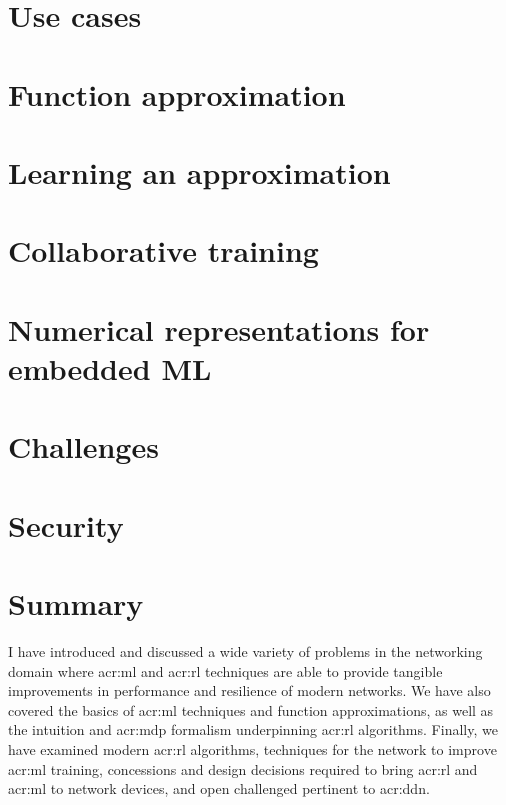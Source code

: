 \section{Use cases}\label{sec:use-cases}%


\section{Function approximation}\label{sec:function-approximation}


\section{Learning an approximation}\label{sec:learning-an-approximation}%


\section{Collaborative training}\label{sec:ddn-collaborative-training}


\section{Numerical representations for embedded ML}\label{sec:numerical-representations-for-embedded-ml}


\section{Challenges}\label{sec:ddn-challenges}


\section{Security}\label{sec:ddn-security}


\section{Summary}
I have introduced and discussed a wide variety of problems in the networking domain where \gls{acr:ml} and \gls{acr:rl} techniques are able to provide tangible improvements in performance and resilience of modern networks.
We have also covered the basics of \gls{acr:ml} techniques and function approximations, as well as the intuition and \gls{acr:mdp} formalism underpinning \gls{acr:rl} algorithms.
Finally, we have examined modern \gls{acr:rl} algorithms, techniques for the network to improve \gls{acr:ml} training, concessions and design decisions required to bring \gls{acr:rl} and \gls{acr:ml} to network devices, and open challenged pertinent to \gls{acr:ddn}.

